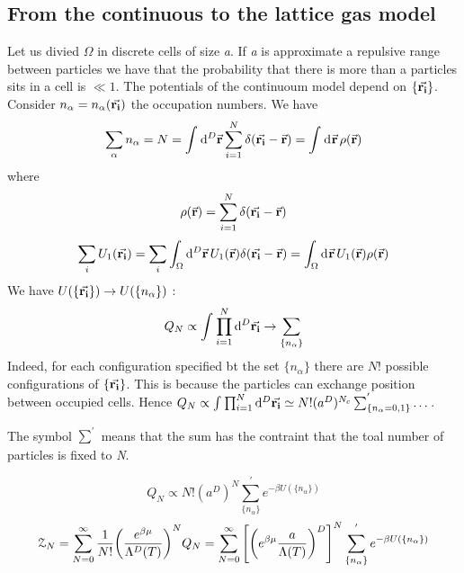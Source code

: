 \documentclass[../main/main.tex]{subfiles}
\begin{document}
\subsection{From the continuous to the lattice gas model}
Let us divied \( \Omega  \) in discrete cells of size \emph{a}. If \emph{a} is approximate a repulsive range between particles we have that the probability that there is more than a particles sits in a cell is \( \ll 1 \). The potentials of the continuoum model depend on  \( \{ \va{r_i} \}   \).
Consider \( n_ \alpha = n_ \alpha (\va{r_i}) \) the occupation numbers. We have
\begin{equation}
  \sum_{\alpha }^{} n_ \alpha = N = \int_{}^{} \dd[D]{\va{r}} \sum_{i=1}^{N} \delta (\va{r_i}-\va{r})= \int_{}^{} \dd[]{\va{r}} \rho (\va{r})
\end{equation}
where
\begin{equation}
  \rho (\va{r}) = \sum_{i=1}^{N}  \delta (\va{r_i}-\va{r})
\end{equation}
\begin{equation}
  \sum_{i}^{} U_1 (\va{r_i}) = \sum_{i}^{} \int_{\Omega }^{} \dd[D]{\va{r}} U_1 (\va{r})   \delta (\va{r_i}-\va{r}) = \int_{\Omega }^{} \dd[]{\va{r}}      U_1 (\va{r}) \rho (\va{r})
\end{equation}
We have \( U (\{ \va{r_i} \}  ) \rightarrow U (\{ n_ \alpha  \}  ) \) :
\begin{equation}
  Q_N \propto \int_{}^{} \prod_{i=1}^{N}  \dd[D]{\va{r_i}}   \rightarrow \sum_{\{ n_ \alpha  \} }^{}
\end{equation}
Indeed, for each configuration specified bt the set \( \{ n_ \alpha  \}  \) there are \( N! \) possible configurations of \( \{ \va{r_i} \}  \). This is because the particles can exchange position between occupied cells.
Hence \(   Q_N \propto \int_{}^{} \prod_{i=1}^{N}  \dd[D]{\va{r_i}} \simeq N! (a^D)^{N_c} \sum_{\{ n_ \alpha = 0, 1 \}}^{'} \dots  \).
\begin{remark}
The symbol \( \sum_{}^{'}   \) means that the sum has the contraint that the toal number of particles is fixed to \emph{N}.
\end{remark}
\begin{equation}
  Q_N \propto N! (a^D)^N \sum_{\{ n_ \alpha  \} }^{'} e^{-\beta U ( \{ n_ \alpha  \} )}
\end{equation}
\begin{equation}
  \mathcal{Z}_N = \sum_{N=0}^{\infty } \frac{1}{N!} \qty(\frac{e^{\beta \mu } }{\Lambda ^D (T)}) ^N Q_N = \sum_{N=0}^{\infty } \qty[\qty(e^{\beta \mu} \frac{a}{\Lambda (T)}  )^D ]  ^N \sum_{\{ n_ \alpha  \} }^{'} e^{-\beta U ( \{ n_ \alpha  \} )}
\end{equation}
\end{document}
